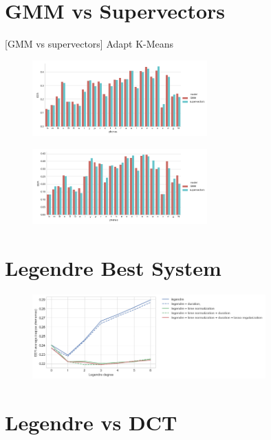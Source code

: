 \section{GMM vs Supervectors}

[GMM vs supervectors] Adapt K-Means

\begin{figure}[H]
	\centering
	\includegraphics[width=0.6\textwidth]{files/figures/results/gmm-vs-supervectors/gmm-vs-supervectors-dev.png}
\end{figure}

\begin{figure}[H]
	\centering
	\includegraphics[width=0.6\textwidth]{files/figures/results/gmm-vs-supervectors/gmm-vs-supervectors-heldout.png}
\end{figure}


\section{Legendre Best System}

\begin{figure}[H]
	\centering
	\includegraphics[width=0.8\textwidth]{files/figures/results/legendre-dct/legendre-tunning.png}
\end{figure}


\section{Legendre vs DCT}

